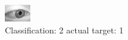 \begin{figure}[h!]
\begin{center}
\includegraphics[width=0.60\columnwidth]{figures/ID2725_class_2_target_1.png}
\end{center}
\caption{ Classification: 2 actual target: 1}
\label{fig:ID2725_class_2_target_1}
\end{figure}
